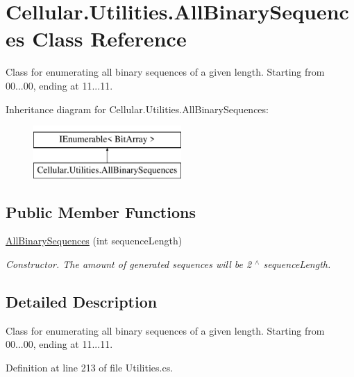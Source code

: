 \hypertarget{class_cellular_1_1_utilities_1_1_all_binary_sequences}{}\section{Cellular.\+Utilities.\+All\+Binary\+Sequences Class Reference}
\label{class_cellular_1_1_utilities_1_1_all_binary_sequences}


Class for enumerating all binary sequences of a given length. Starting from 00...00, ending at 11...11.  


Inheritance diagram for Cellular.\+Utilities.\+All\+Binary\+Sequences\+:\begin{figure}[H]
\begin{center}
\leavevmode
\includegraphics[height=2.000000cm]{class_cellular_1_1_utilities_1_1_all_binary_sequences}
\end{center}
\end{figure}
\subsection*{Public Member Functions}
\begin{DoxyCompactItemize}
\item 
\hyperlink{class_cellular_1_1_utilities_1_1_all_binary_sequences_adb657130e38906af075a17acf6e16364}{All\+Binary\+Sequences} (int sequence\+Length)
\begin{DoxyCompactList}\small\item\em Constructor. The amount of generated sequences will be 2 $^\wedge$ {\ttfamily sequence\+Length}. \end{DoxyCompactList}\end{DoxyCompactItemize}


\subsection{Detailed Description}
Class for enumerating all binary sequences of a given length. Starting from 00...00, ending at 11...11. 



Definition at line 213 of file Utilities.\+cs.



